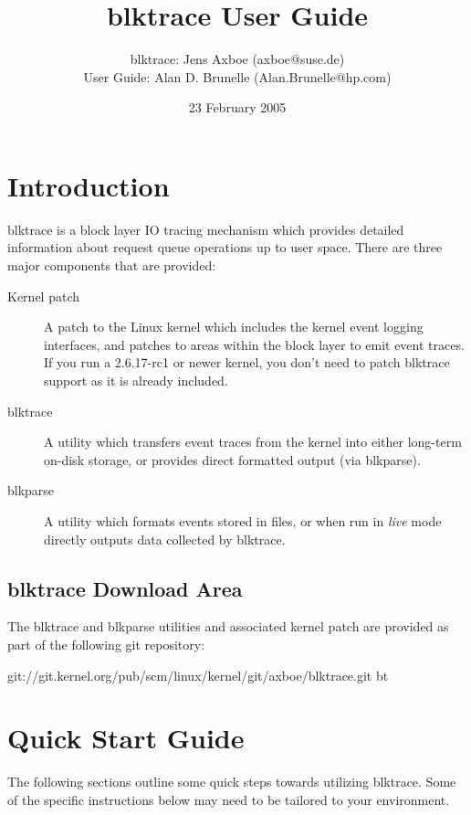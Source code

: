 \documentclass{article}
\title{blktrace User Guide}
\author{blktrace: Jens Axboe (axboe@suse.de)\\
        User Guide: Alan D. Brunelle (Alan.Brunelle@hp.com)}
\date{23 February 2005}
\begin{document}
\maketitle
\section{\label{sec:intro}Introduction}

blktrace is a block layer IO tracing mechanism which provides detailed
information about request queue operations up to user space. There are
three major components that are provided:

\begin{description}
  \item[Kernel patch] A patch to the Linux kernel which includes the
  kernel event logging interfaces, and patches to areas within the block
  layer to emit event traces. If you run a 2.6.17-rc1 or newer kernel,
  you don't need to patch blktrace support as it is already included.

  \item[blktrace] A utility which transfers event traces from the kernel
  into either long-term on-disk storage, or provides direct formatted
  output (via blkparse).

  \item[blkparse] A utility which formats events stored in files, or when
  run in \emph{live} mode directly outputs data collected by blktrace.
\end{description}

\subsection{blktrace Download Area}

The blktrace and blkparse utilities and associated kernel patch are provided
as part of the following git repository:

git://git.kernel.org/pub/scm/linux/kernel/git/axboe/blktrace.git bt

\newpage\section{\label{sec:quick-start}Quick Start Guide}

The following sections outline some quick steps towards utilizing
blktrace. Some of the specific instructions below may need to be tailored
to your environment.
\end{document}
